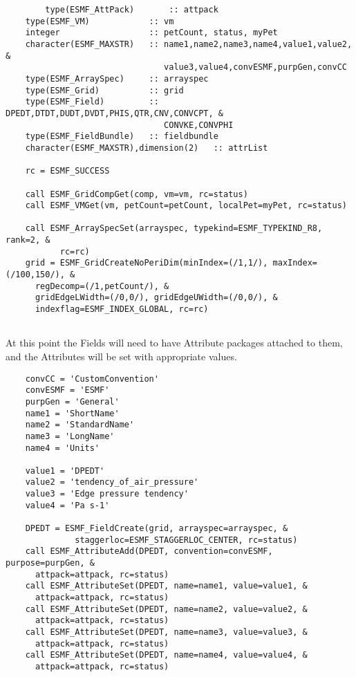  \begin{verbatim}
        type(ESMF_AttPack)       :: attpack
    type(ESMF_VM)            :: vm
    integer                  :: petCount, status, myPet
    character(ESMF_MAXSTR)   :: name1,name2,name3,name4,value1,value2, &
                                value3,value4,convESMF,purpGen,convCC
    type(ESMF_ArraySpec)     :: arrayspec
    type(ESMF_Grid)          :: grid
    type(ESMF_Field)         :: DPEDT,DTDT,DUDT,DVDT,PHIS,QTR,CNV,CONVCPT, &
                                CONVKE,CONVPHI
    type(ESMF_FieldBundle)   :: fieldbundle
    character(ESMF_MAXSTR),dimension(2)   :: attrList

    rc = ESMF_SUCCESS

    call ESMF_GridCompGet(comp, vm=vm, rc=status)
    call ESMF_VMGet(vm, petCount=petCount, localPet=myPet, rc=status)

    call ESMF_ArraySpecSet(arrayspec, typekind=ESMF_TYPEKIND_R8, rank=2, &
           rc=rc)
    grid = ESMF_GridCreateNoPeriDim(minIndex=(/1,1/), maxIndex=(/100,150/), &
      regDecomp=(/1,petCount/), &
      gridEdgeLWidth=(/0,0/), gridEdgeUWidth=(/0,0/), &
      indexflag=ESMF_INDEX_GLOBAL, rc=rc)
 
\end{verbatim}
 

   At this point the Fields will need to have Attribute packages attached to them, and the
   Attributes will be set with appropriate values. 

 \begin{verbatim}
    convCC = 'CustomConvention'
    convESMF = 'ESMF'
    purpGen = 'General'
    name1 = 'ShortName'
    name2 = 'StandardName'
    name3 = 'LongName'
    name4 = 'Units'

    value1 = 'DPEDT'
    value2 = 'tendency_of_air_pressure'
    value3 = 'Edge pressure tendency'
    value4 = 'Pa s-1'

    DPEDT = ESMF_FieldCreate(grid, arrayspec=arrayspec, &
              staggerloc=ESMF_STAGGERLOC_CENTER, rc=status)
    call ESMF_AttributeAdd(DPEDT, convention=convESMF, purpose=purpGen, &
      attpack=attpack, rc=status)
    call ESMF_AttributeSet(DPEDT, name=name1, value=value1, &
      attpack=attpack, rc=status)
    call ESMF_AttributeSet(DPEDT, name=name2, value=value2, &
      attpack=attpack, rc=status)
    call ESMF_AttributeSet(DPEDT, name=name3, value=value3, &
      attpack=attpack, rc=status)
    call ESMF_AttributeSet(DPEDT, name=name4, value=value4, &
      attpack=attpack, rc=status)

 
\end{verbatim}
 
